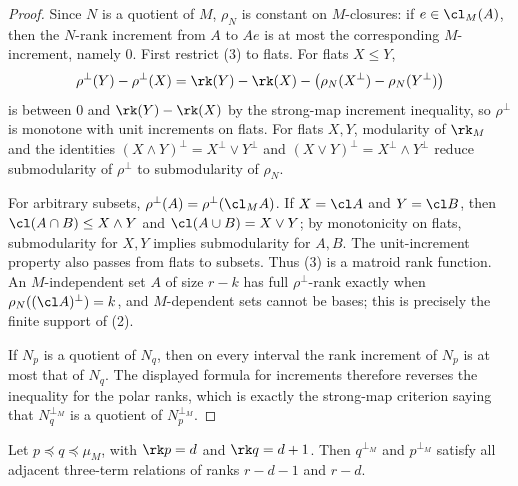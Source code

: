 \begin{proof}
Since $N$ is a quotient of $M$, $\rho_N$ is constant on $M$-closures:
if $e\in\cl_M(A)$, then the $N$-rank increment from $A$ to $Ae$ is at
most the corresponding $M$-increment, namely $0$.  First restrict (3) to
flats.  For flats $X\le Y$,
\[
\rho^\perp(Y)-\rho^\perp(X)
 =\rk(Y)-\rk(X)-\bigl(\rho_N(X^\perp)-\rho_N(Y^\perp)\bigr)
\]
is between $0$ and $\rk(Y)-\rk(X)$ by the strong-map increment
inequality, so $\rho^\perp$ is monotone with unit increments on flats.
For flats $X,Y$, modularity of $\rk_M$ and the identities
$(X\wedge Y)^\perp=X^\perp\vee Y^\perp$ and
$(X\vee Y)^\perp=X^\perp\wedge Y^\perp$ reduce submodularity of
$\rho^\perp$ to submodularity of $\rho_N$.

For arbitrary subsets, $\rho^\perp(A)=\rho^\perp(\cl_M A)$.  If
$X=\cl A$ and $Y=\cl B$, then
$\cl(A\cap B)\le X\wedge Y$ and $\cl(A\cup B)=X\vee Y$; by monotonicity
on flats, submodularity for $X,Y$ implies submodularity for $A,B$.
The unit-increment property also passes from flats to subsets.  Thus
(3) is a matroid rank function.  An $M$-independent set $A$ of size
$r-k$ has full $\rho^\perp$-rank exactly when
$\rho_N((\cl A)^\perp)=k$, and $M$-dependent sets cannot be bases; this
is precisely the finite support of (2).

If $N_p$ is a quotient of $N_q$, then on every interval the rank
increment of $N_p$ is at most that of $N_q$.  The displayed formula for
increments therefore reverses the inequality for the polar ranks, which
is exactly the strong-map criterion saying that $N_q^{\perp_M}$ is a
quotient of $N_p^{\perp_M}$.
\end{proof}

\begin{lemma}\label{lem:elementary}
Let $p\preceq q\preceq\mu_M$, with $\rk p=d$ and $\rk q=d+1$.  Then
$q^{\perp_M}$ and $p^{\perp_M}$ satisfy all adjacent three-term
relations of ranks $r-d-1$ and $r-d$.
\end{lemma}

